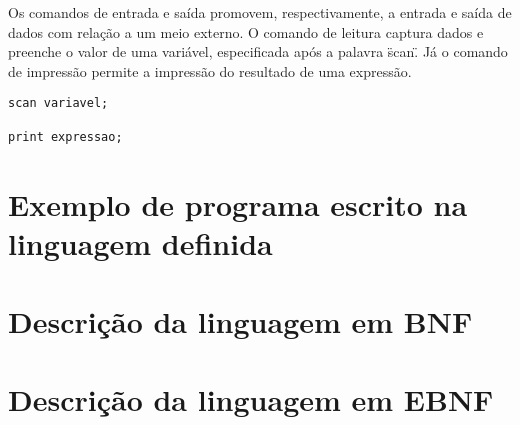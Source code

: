 \documentclass[12pt,oneside,a4paper,english]{abntex2}
\begin{document}
  Os comandos de entrada e saída promovem, respectivamente, a entrada e saída de dados com relação a um meio externo. O comando de leitura captura dados e preenche o valor de uma variável, especificada após a palavra \"scan\". Já o comando de impressão permite a impressão do resultado de uma expressão.

\begin{lstlisting}
scan variavel;

print expressao;
\end{lstlisting}

\chapter{Exemplo de programa escrito na linguagem definida}



\chapter{Descrição da linguagem em BNF}



\chapter{Descrição da linguagem em EBNF}
\end{document}
